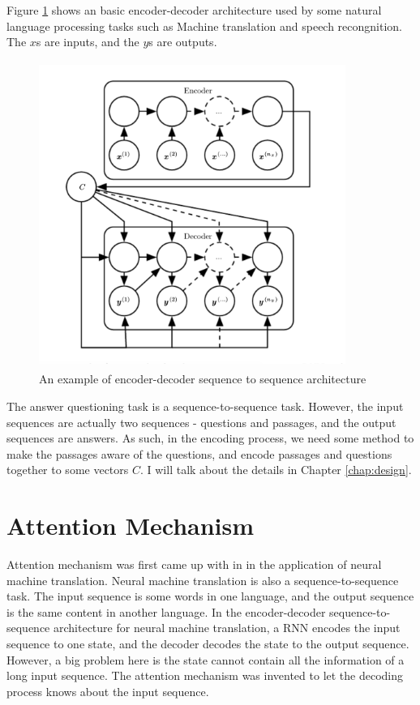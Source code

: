 \documentclass[modernstyle,12pt]{sjsuthesis}
\theoremstyle{definition}
\begin{document}
Figure \ref{f:encoderDecoder} shows an basic encoder-decoder architecture used by some natural language processing tasks such as Machine translation and speech recongnition. The $x$s are inputs, and the $y$s are outputs.

\begin{figure}[htbp]\centering
  \includegraphics[width=10cm, height=10cm]{figures/encoderDecoder.png}
  \caption{An example of encoder-decoder sequence to sequence architecture\cite{goodfellow2016deep}}
  \label{f:encoderDecoder}
\end{figure}

The answer questioning task is a sequence-to-sequence task. However, the input sequences are actually two sequences - questions and passages, and the output sequences are answers. As such, in the encoding process, we need some method to make the passages aware of the questions, and encode passages and questions together to some vectors $C$. I will talk about the details in Chapter \ref{chap:design}.

\section{Attention Mechanism}\label{sect:attention}

Attention mechanism was first came up with in \cite{bahdanau2014neural} in the application of neural machine translation. Neural machine translation is also a sequence-to-sequence task. The input sequence is some words in one language, and the output sequence is the same content in another language. In the encoder-decoder sequence-to-sequence architecture for neural machine translation, a RNN encodes the input sequence to one state, and the decoder decodes the state to the output sequence. However, a big problem here is the state cannot contain all the information of a long input sequence. The attention mechanism was invented to let the decoding process knows about the input sequence.
\end{document}
